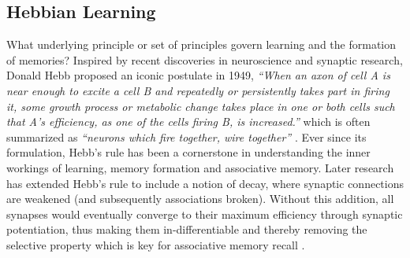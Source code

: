 \subsection{Hebbian Learning}

What underlying principle or set of principles govern learning and the formation of memories? Inspired by recent discoveries in neuroscience and synaptic research, Donald Hebb proposed an iconic postulate in 1949, \textit{``When an axon of cell A is near enough to excite a cell B and repeatedly or persistently takes part in firing it, some growth process or metabolic change takes place in one or both cells such that A's efficiency, as one of the cells firing B, is increased.''} which is often summarized as \textit{``neurons which fire together, wire together''} \cite{hebbs_rule}. Ever since its formulation, Hebb's rule has been a cornerstone in understanding the inner workings of learning, memory formation and associative memory. Later research has extended Hebb's rule to include a notion of decay, where synaptic connections are weakened (and subsequently associations broken). Without this addition, all synapses would eventually converge to their maximum efficiency through synaptic potentiation, thus making them in-differentiable and thereby removing the selective property which is key for associative memory recall \cite{anti_hebbian}.
